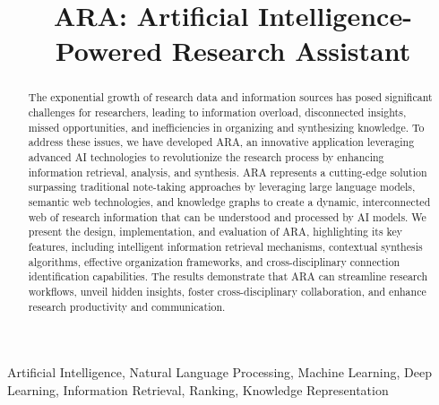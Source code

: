 \documentclass[a4paper,conference]{IEEEtran}
\begin{document}
\title{ARA: Artificial Intelligence-Powered Research Assistant}

\author{
}

\maketitle

\begin{abstract}
The exponential growth of research data and information sources has posed significant challenges for researchers, leading to information overload, disconnected insights, missed opportunities, and inefficiencies in organizing and synthesizing knowledge. To address these issues, we have developed ARA, an innovative application leveraging advanced AI technologies to revolutionize the research process by enhancing information retrieval, analysis, and synthesis. ARA represents a cutting-edge solution surpassing traditional note-taking approaches by leveraging large language models, semantic web technologies, and knowledge graphs to create a dynamic, interconnected web of research information that can be understood and processed by AI models. We present the design, implementation, and evaluation of ARA, highlighting its key features, including intelligent information retrieval mechanisms, contextual synthesis algorithms, effective organization frameworks, and cross-disciplinary connection identification capabilities. The results demonstrate that ARA can streamline research workflows, unveil hidden insights, foster cross-disciplinary collaboration, and enhance research productivity and communication.
\end{abstract}

\begin{IEEEkeywords}
Artificial Intelligence, Natural Language Processing, Machine Learning, Deep Learning, Information Retrieval, Ranking, Knowledge Representation
\end{IEEEkeywords}
\end{document}
